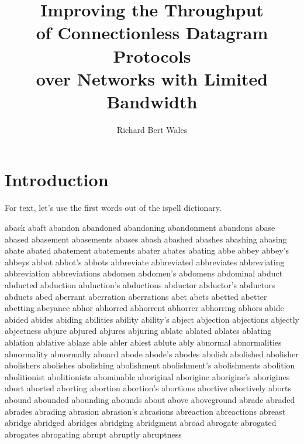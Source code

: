 \documentclass [PhD] {uclathes}
\title          {Improving the Throughput \\
                of Connectionless Datagram Protocols \\
                over Networks with Limited Bandwidth}
\author         {Richard Bert Wales}
\begin{document}
\makeintropages

%
%

\chapter{Introduction}

For text, let's use the first words out of the ispell dictionary.

aback
abaft
abandon
abandoned
abandoning
abandonment
abandons
abase
abased
abasement
abasements
abases
abash
abashed
abashes
abashing
abasing
abate
abated
abatement
abatements
abater
abates
abating
abbe
abbey
abbey's
abbeys
abbot
abbot's
abbots
abbreviate
abbreviated
abbreviates
abbreviating
abbreviation
abbreviations
abdomen
abdomen's
abdomens
abdominal
abduct
abducted
abduction
abduction's
abductions
abductor
abductor's
abductors
abducts
abed
aberrant
aberration
aberrations
abet
abets
abetted
abetter
abetting
abeyance
abhor
abhorred
abhorrent
abhorrer
abhorring
abhors
abide
abided
abides
abiding
abilities
ability
ability's
abject
abjection
abjections
abjectly
abjectness
abjure
abjured
abjures
abjuring
ablate
ablated
ablates
ablating
ablation
ablative
ablaze
able
abler
ablest
ablute
ably
abnormal
abnormalities
abnormality
abnormally
aboard
abode
abode's
abodes
abolish
abolished
abolisher
abolishers
abolishes
abolishing
abolishment
abolishment's
abolishments
abolition
abolitionist
abolitionists
abominable
aboriginal
aborigine
aborigine's
aborigines
abort
aborted
aborting
abortion
abortion's
abortions
abortive
abortively
aborts
abound
abounded
abounding
abounds
about
above
aboveground
abrade
abraded
abrades
abrading
abrasion
abrasion's
abrasions
abreaction
abreactions
abreast
abridge
abridged
abridges
abridging
abridgment
abroad
abrogate
abrogated
abrogates
abrogating
abrupt
abruptly
abruptness

\end{document}
